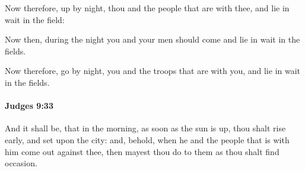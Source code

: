 			\begin{versebox}
					\item[BHS] 
					\item[ASV] Now therefore, up by night, thou and the people that are with thee, and lie in wait in the field:
					\item[NIV] Now then, during the night you and your men should come and lie in wait in the fields.
					\item[NRSV] Now therefore, go by night, you and the troops that are with you, and lie in wait in the fields.
			\end{versebox}

		\paragraph{Judges 9:33} %
			\label{JUDGES-9-33}

			And it shall be, that in the morning, as soon as the sun is up, thou shalt rise early, and set upon the city: and, behold, when he and the people that is with him come out against thee, then mayest thou do to them as thou shalt find occasion.

